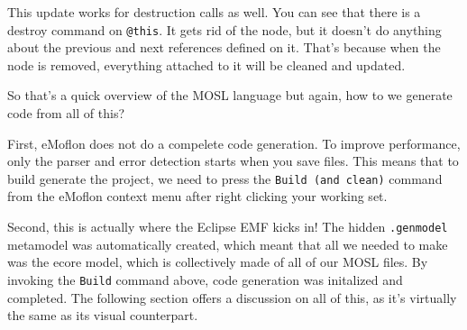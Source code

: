 This update works for destruction calls as well. You can see that there is a destroy command on \texttt{@this}. It gets rid of the node, but it doesn't do anything about the previous and next references defined on it. That's because when the node is removed, everything attached to it will be cleaned and updated.
 
So that's a quick overview of the MOSL language but again, how to we generate code from all of this?

First, eMoflon does not do a compelete code generation. To improve performance, only the parser and error detection starts when you save files. This means that to build generate the project, we need to press the \texttt{Build (and clean)} command from the eMoflon context menu after right clicking your working set.


Second, this is actually where the Eclipse EMF kicks in! The hidden \texttt{.genmodel} metamodel was automatically created, which meant that all we needed to make was the ecore model, which is collectively made of all of our MOSL files. By invoking the \texttt{Build} command above, code generation was initalized and completed. The following section offers a discussion on all of this, as it's virtually the same as its visual counterpart.